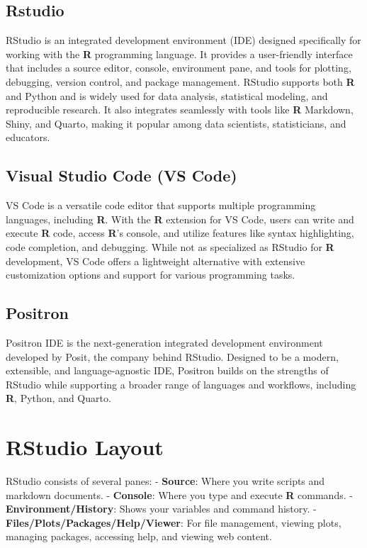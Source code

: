 \documentclass[
  letterpaper,
  DIV=11,
  numbers=noendperiod]{scrreprt}
\begin{document}
\subsection{Rstudio}\label{rstudio}

RStudio is an integrated development environment (IDE) designed
specifically for working with the \textbf{R} programming language. It
provides a user-friendly interface that includes a source editor,
console, environment pane, and tools for plotting, debugging, version
control, and package management. RStudio supports both \textbf{R} and
Python and is widely used for data analysis, statistical modeling, and
reproducible research. It also integrates seamlessly with tools like
\textbf{R} Markdown, Shiny, and Quarto, making it popular among data
scientists, statisticians, and educators.

\subsection{Visual Studio Code (VS
Code)}\label{visual-studio-code-vs-code}

VS Code is a versatile code editor that supports multiple programming
languages, including \textbf{R}. With the \textbf{R} extension for VS
Code, users can write and execute \textbf{R} code, access \textbf{R}'s
console, and utilize features like syntax highlighting, code completion,
and debugging. While not as specialized as RStudio for \textbf{R}
development, VS Code offers a lightweight alternative with extensive
customization options and support for various programming tasks.

\subsection{Positron}\label{positron}

Positron IDE is the next-generation integrated development environment
developed by Posit, the company behind RStudio. Designed to be a modern,
extensible, and language-agnostic IDE, Positron builds on the strengths
of RStudio while supporting a broader range of languages and workflows,
including \textbf{R}, Python, and Quarto.

\section{RStudio Layout}\label{rstudio-layout}

RStudio consists of several panes: - \textbf{Source}: Where you write
scripts and markdown documents. - \textbf{Console}: Where you type and
execute \textbf{R} commands. - \textbf{Environment/History}: Shows your
variables and command history. -
\textbf{Files/Plots/Packages/Help/Viewer}: For file management, viewing
plots, managing packages, accessing help, and viewing web content.
\end{document}
